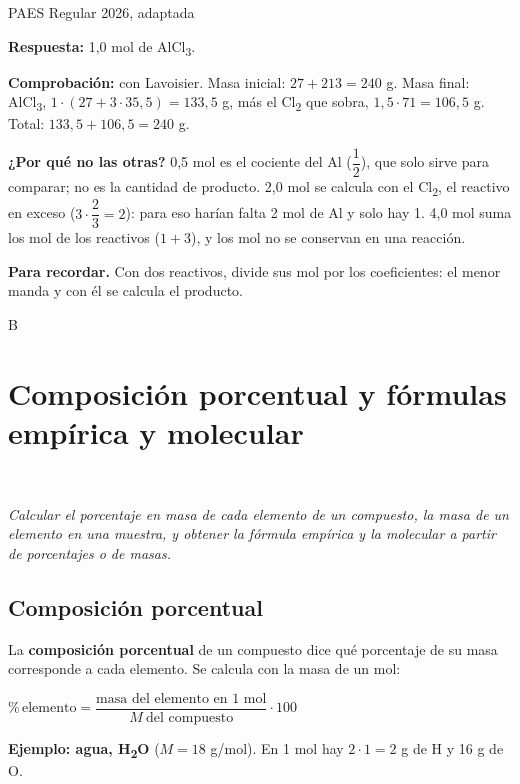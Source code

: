 \begin{elejemplo}{PAES Regular 2026, adaptada}
{\textbf{Respuesta:} 1,0 mol de AlCl\textsubscript{3}.

\textbf{Comprobación:} con Lavoisier. Masa inicial: $27 + 213 = 240$ g. Masa final: AlCl\textsubscript{3}, $1\cdot(27 + 3\cdot 35{,}5) = 133{,}5$ g, más el Cl\textsubscript{2} que sobra, $1{,}5\cdot 71 = 106{,}5$ g. Total: $133{,}5 + 106{,}5 = 240$ g. 

\textbf{¿Por qué no las otras?} 0,5 mol es el cociente del Al ($\dfrac{1}{2}$), que solo sirve para comparar; no es la cantidad de producto. 2,0 mol se calcula con el Cl\textsubscript{2}, el reactivo en exceso ($3\cdot\dfrac{2}{3} = 2$): para eso harían falta 2 mol de Al y solo hay 1. 4,0 mol suma los mol de los reactivos ($1 + 3$), y los mol no se conservan en una reacción.

\textbf{\color{cienciaD}Para recordar.} Con dos reactivos, divide sus mol por los coeficientes: el menor manda y con él se calcula el producto.}{B}
\end{elejemplo}

\section[Composición porcentual y fórmulas empírica y molecular]{Composición porcentual y fórmulas empírica y molecular}
\modcomun\ \ {\color{gris}\itshape Calcular el porcentaje en masa de cada elemento de un compuesto, la masa de un elemento en una muestra, y obtener la fórmula empírica y la molecular a partir de porcentajes o de masas.\par}
\subsection{Composición porcentual}
La \textbf{composición porcentual} de un compuesto dice qué porcentaje de su masa corresponde a cada elemento. Se calcula con la masa de un mol:

 
\begin{center}
$\%\,\text{elemento} = \dfrac{\text{masa del elemento en 1 mol}}{M\ \text{del compuesto}}\cdot 100$
\end{center}
 

\textbf{Ejemplo: agua, H\textsubscript{2}O} ($M = 18$ g/mol). En 1 mol hay $2\cdot 1 = 2$ g de H y 16 g de O.

